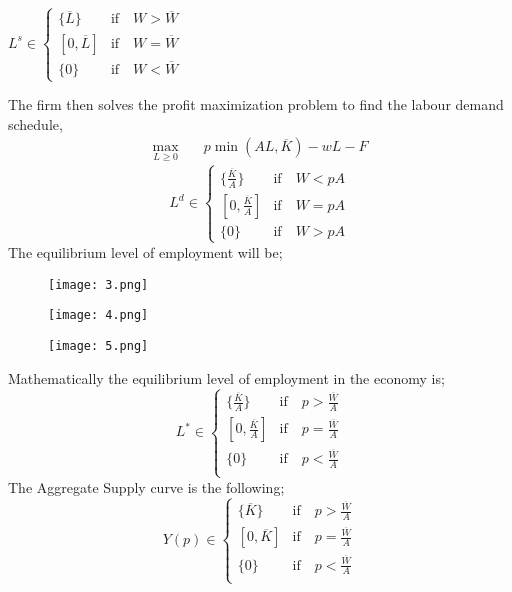 \(L^s \in \begin{cases}
  \{\overline{L}\} & \text{if} \quad W > \overline{W}\\
  [0 , \overline{L}] & \text{if} \quad W = \overline{W}\\
  \{0\} & \text{if} \quad W < \overline{W}
\end{cases}\) 

 The firm then solves the profit maximization problem to find the labour demand schedule,
 \begin{align*}
     \max_{L \geq 0 }  & \quad p \min(AL , \overline{K}) - wL - F
 \end{align*}
 \[ L^d \in \begin{cases}
   \{ \frac{\overline{K}}{A}\} & \text{if} \quad W<pA\\
   [0 , \frac{\overline{K}}{A}] & \text{if} \quad W=pA\\
   \{0\} & \text{if} \quad W>pA
 \end{cases} \] 
 The equilibrium level of employment will be;

 \begin{figure}[H]
 \centering
 \texttt{[image: 3.png]}
 \end{figure}


 \begin{figure}[H]
 \centering
 \texttt{[image: 4.png]}
 \end{figure}

 \begin{figure}[H]
 \centering
 \texttt{[image: 5.png]}
 \end{figure}
Mathematically the equilibrium level of employment in the economy is;
\[L^* \in \begin{cases}
  \{\frac{\overline{K}}{A}\}  & \text{if} \quad p > \frac{\overline{W}}{A} \\
  [0 , \frac{\overline{K}}{A}] & \text{if} \quad p = \frac{\overline{W}}{A} \\
  \{0\}  & \text{if} \quad p < \frac{\overline{W}}{A} \\
\end{cases}\] 
The Aggregate Supply curve is the following;
\[Y(p) \in \begin{cases}
  \{\overline{K}\}  & \text{if} \quad p > \frac{\overline{W}}{A} \\
  [0 , \overline{K}] & \text{if} \quad p = \frac{\overline{W}}{A} \\
  \{0\}  & \text{if} \quad p < \frac{\overline{W}}{A} \\
\end{cases}\] 

